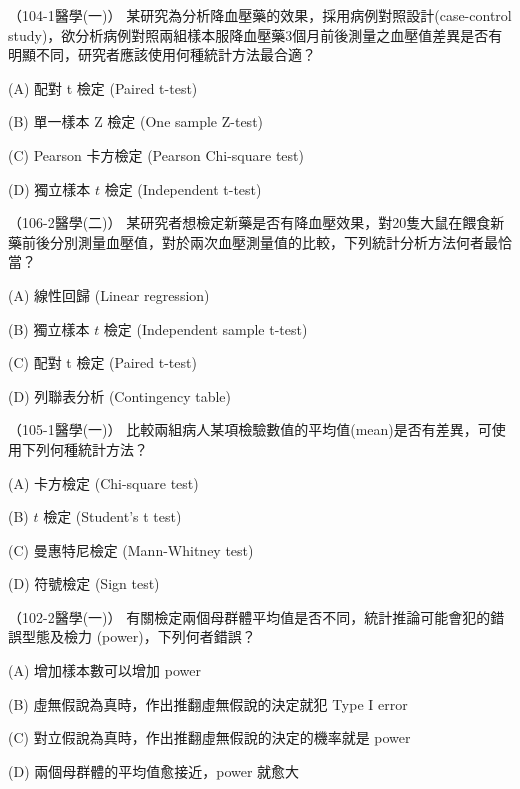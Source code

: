     \bigskip 
    
    \begin{docexam}{（104-1醫學(一)）}
        某研究為分析降血壓藥的效果，採用病例對照設計(case-control study)，欲分析病例對照兩組樣本服降血壓藥3個月前後測量之血壓值差異是否有明顯不同，研究者應該使用何種統計方法最合適？

        (A) 配對 t 檢定 (Paired t-test)

        (B) 單一樣本 Z 檢定 (One sample Z-test)

        (C) Pearson 卡方檢定 (Pearson Chi-square test)

        (D) 獨立樣本 $t$ 檢定 (Independent t-test)
    \end{docexam}
    
    \begin{docexam}{（106-2醫學(二)）}
        某研究者想檢定新藥是否有降血壓效果，對20隻大鼠在餵食新藥前後分別測量血壓值，對於兩次血壓測量值的比較，下列統計分析方法何者最恰當？

        (A) 線性回歸 (Linear regression)

        (B) 獨立樣本 $t$ 檢定 (Independent sample t-test)

        (C) 配對 t 檢定 (Paired t-test)

        (D) 列聯表分析 (Contingency table)
    \end{docexam}
    
    \begin{docexam}{（105-1醫學(一)）}
        比較兩組病人某項檢驗數值的平均值(mean)是否有差異，可使用下列何種統計方法？

        (A) 卡方檢定 (Chi-square test)

        (B) $t$ 檢定 (Student's t test)

        (C) 曼惠特尼檢定 (Mann-Whitney test)

        (D) 符號檢定 (Sign test)
    \end{docexam}
    
    \begin{docexam}{（102-2醫學(一)）}
        有關檢定兩個母群體平均值是否不同，統計推論可能會犯的錯誤型態及檢力 (power)，下列何者錯誤？

        (A) 增加樣本數可以增加 power

        (B) 虛無假說為真時，作出推翻虛無假說的決定就犯 Type I error

        (C) 對立假說為真時，作出推翻虛無假說的決定的機率就是 power

        (D) 兩個母群體的平均值愈接近，power 就愈大
    \end{docexam}
    
